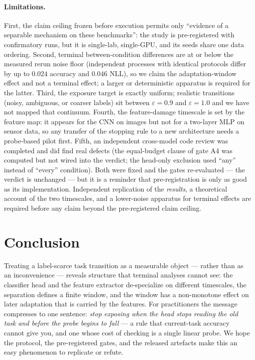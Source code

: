 \documentclass[review,12pt]{elsarticle}
\begin{document}
\paragraph{Limitations.}
First, the claim ceiling frozen before execution permits only ``evidence of a
separable mechanism on these benchmarks'': the study is pre-registered with
\NumConfirmatory{} confirmatory runs, but it is single-lab, single-GPU, and
its seeds share one data ordering.
Second, terminal between-condition differences are at or below the measured
rerun noise floor (independent processes with identical protocols differ by up
to $0.024$ accuracy and $0.046$ NLL), so we claim the adaptation-window effect
and not a terminal effect; a larger or deterministic apparatus is required for
the latter. Third, the exposure target is exactly uniform; realistic
transitions (noisy, ambiguous, or coarser labels) sit between
$\varepsilon=0.9$ and $\varepsilon=1.0$ and we have not mapped that continuum.
Fourth, the feature-damage timescale is set by the feature map: it appears for
the CNN on images but not for a two-layer MLP on sensor data, so any transfer
of the stopping rule to a new architecture needs a probe-based pilot first.
Fifth, an independent cross-model code review was completed and did find real
defects (the equal-budget clause of gate A4 was computed but not wired into the
verdict; the head-only exclusion used ``any'' instead of ``every''
condition). Both were fixed and the gates re-evaluated --- the verdict is
unchanged --- but it is a reminder that pre-registration is only as good as its
implementation. Independent replication of the \emph{results}, a theoretical
account of the two timescales, and a lower-noise apparatus for terminal
effects are required before any claim beyond the pre-registered claim ceiling.

\section{Conclusion}
\label{sec:conclusion}
Treating a label-scarce task transition as a measurable object --- rather than
as an inconvenience --- reveals structure that terminal analyses cannot see:
the classifier head and the feature extractor de-specialize on different
timescales, the separation defines a finite window, and the window has a
non-monotone effect on later adaptation that is carried by the features. For
practitioners the message compresses to one sentence: \emph{stop exposing when
the head stops reading the old task and before the probe begins to fall} --- a
rule that current-task accuracy cannot give you, and one whose cost of
checking is a single linear probe. We hope the protocol, the pre-registered
gates, and the released artefacts make this an easy phenomenon to replicate or
refute.
\end{document}
